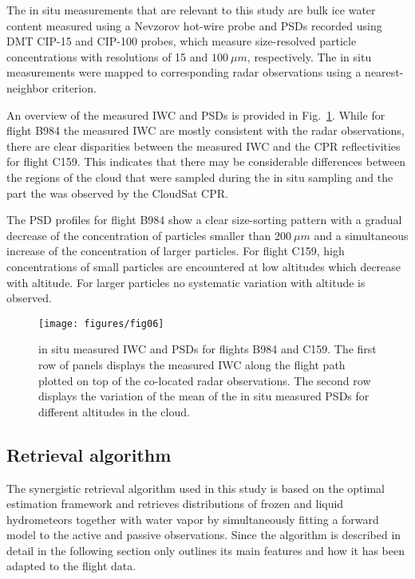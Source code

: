 \documentclass[journal abbreviation, manuscript]{copernicus}
\begin{document}
The in situ measurements that are relevant to this study are bulk ice water
content measured using a Nevzorov hot-wire probe \citep{korolev13} and PSDs
recorded using DMT CIP-15 and CIP-100 probes, which measure size-resolved
particle concentrations with resolutions of 15 and $100\ \unit{\mu m}$,
respectively. The in situ measurements were mapped to corresponding radar
observations using a nearest-neighbor criterion.

An overview of the measured IWC and PSDs is provided in Fig.~\ref{fig:in_situ}.
While for flight B984 the measured IWC are mostly consistent with the radar
observations, there are clear disparities between the measured IWC and the CPR
reflectivities for flight C159. This indicates that there may be considerable
differences between the regions of the cloud that were sampled during the
in situ sampling and the part the was observed by the CloudSat CPR.

The PSD profiles for flight B984 show a clear size-sorting pattern with a
gradual decrease of the concentration of particles smaller than $200\ \unit{\mu
  m}$ and a simultaneous increase of the concentration of larger particles. For
flight C159, high concentrations of small particles are encountered at low
altitudes which decrease with altitude. For larger particles no systematic
variation with altitude is observed.

\begin{figure}[hbpt!]
  \centering
  \texttt{[image: figures/fig06]}
  \caption{ in situ measured IWC and PSDs for flights B984 and C159. The first
    row of panels displays the measured IWC along the flight path plotted on top
    of the co-located radar observations. The second row displays the variation
    of the mean of the in situ measured PSDs for different altitudes in the
    cloud.
    }
  \label{fig:in_situ}
\end{figure}

\subsection{Retrieval algorithm}
\label{sec:synergistic_retrieval}

The synergistic retrieval algorithm used in this study is based on the optimal
estimation framework \citep{rodgers00} and retrieves distributions of frozen and
liquid hydrometeors together with water vapor by simultaneously fitting a
forward model to the active and passive observations. Since the algorithm is
described in detail in \citet{pfreundschuh20} the following section only
outlines its main features and how it has been adapted to the flight data.
\end{document}
